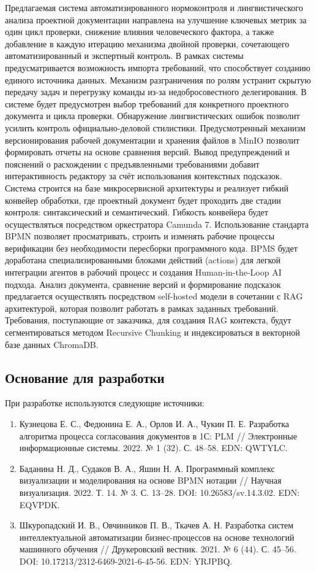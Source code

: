 Предлагаемая система автоматизированного нормоконтроля 
и лингвистического анализа проектной документации направлена 
на улучшение ключевых метрик за один цикл проверки, 
снижение влияния человеческого фактора, 
а также добавление в каждую итерацию механизма двойной проверки, 
сочетающего автоматизированный и экспертный контроль. 
В рамках системы предусматривается возможность импорта требований, 
что способствует созданию единого источника данных. 
Механизм разграничения по ролям устранит скрытую передачу 
задач и перегрузку команды из-за недобросовестного делегирования. 
В системе будет предусмотрен выбор требований для конкретного проектного 
документа и цикла проверки. Обнаружение лингвистических ошибок позволит 
усилить контроль официально-деловой стилистики. Предусмотренный 
механизм версионирования рабочей документации и хранения файлов в 
MinIO позволит формировать отчеты на основе сравнения версий. 
Вывод предупреждений и пояснений о расхождении с предъявленными 
требованиями добавит интерактивность редактору за счёт использования 
контекстных подсказок. Система строится на базе микросервисной архитектуры 
и реализует гибкий конвейер обработки, где проектный документ будет проходить 
две стадии контроля: синтаксический и семантический. Гибкость конвейера 
будет осуществляться посредством оркестратора Camunda 7. 
Использование стандарта BPMN позволяет просматривать, 
строить и изменять рабочие процессы верификации без необходимости 
пересборки программного кода. BPMS будет доработана специализированными 
блоками действий (actions) для легкой интеграции агентов в рабочий процесс и 
создания Human-in-the-Loop AI подхода. Анализ документа, сравнение версий и 
формирование подсказок предлагается осуществлять посредством self-hosted 
модели в сочетании с RAG архитектурой, которая позволит работать в 
рамках заданных требований. Требования, поступающие от заказчика, 
для создания RAG контекста, будут сегментироваться методом Recursive Chunking 
и индексироваться в векторной базе данных ChromaDB.

\subsection{Основание для разработки}
При разработке используются следующие источники:
\begin{enumerate}[label=\arabic*., nosep, leftmargin=*, labelindent=\parindent]
  \item Кузнецова Е. С., Федюнина Е. А., Орлов И. А., Чукин П. Е. Разработка алгоритма процесса согласования документов в 1С: PLM // Электронные информационные системы. 2022. № 1 (32). С. 48–58. EDN: QWTYLC.
  \item Баданина Н. Д., Судаков В. А., Яшин Н. А. Программный комплекс визуализации и моделирования на основе BPMN нотации // Научная визуализация. 2022. Т. 14. № 3. С. 13–28. DOI: 10.26583/sv.14.3.02. EDN: EQVPDK.
  \item Шкуропадский И. В., Овчинников П. В., Ткачев А. Н. Разработка систем интеллектуальной автоматизации бизнес-процессов на основе технологий машинного обучения // Друкеровский вестник. 2021. № 6 (44). С. 45–56. DOI: 10.17213/2312-6469-2021-6-45-56. EDN: YRJPBQ.
\end{enumerate}

